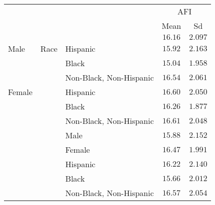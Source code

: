 \begin{tabular}{lllcc}
\hline
& & & \multicolumn{2}{c}{AFI} \\ 
 &  &  & Mean & \multicolumn{1}{c}{Sd} \\ 
\hline
 &  &   & $16.16$ & $2.097$ \\
\nopagebreak Male & Race & \nopagebreak Hispanic  & $15.92$ & $2.163$ \\
 &  & \nopagebreak Black  & $15.04$ & $1.958$ \\
 &  & \nopagebreak Non-Black, Non-Hispanic  & $16.54$ & $2.061$ \\
\nopagebreak Female &  & \nopagebreak Hispanic  & $16.60$ & $2.050$ \\
 &  & \nopagebreak Black  & $16.26$ & $1.877$ \\
 &  & \nopagebreak Non-Black, Non-Hispanic  & $16.61$ & $2.048$ \\
 &  & \nopagebreak Male  & $15.88$ & $2.152$ \\
 &  & \nopagebreak Female  & $16.47$ & $1.991$ \\
 &  & \nopagebreak Hispanic  & $16.22$ & $2.140$ \\
 &  & \nopagebreak Black  & $15.66$ & $2.012$ \\
 &  & \nopagebreak Non-Black, Non-Hispanic  & $16.57$ & $2.054$ \\
\hline 
\end{tabular}
